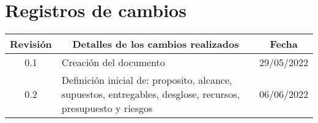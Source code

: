 \section{Registros de cambios}
\label{sec:registro}


\begin{table}[ht]
\label{tab:registro}
\centering
\begin{tabularx}{\linewidth}{@{}|c|X|c|@{}}
\hline
\rowcolor[HTML]{C0C0C0} 
Revisión & \multicolumn{1}{c|}{\cellcolor[HTML]{C0C0C0}Detalles de los cambios realizados} & Fecha      \\ \hline
0.1 & Creación del documento& 29/05/2022\\ \hline
0.2 & Definición inicial de: proposito, alcance, supuestos, entregables, desglose, recursos, presupuesto y riesgos& 06/06/2022\\ \hline
\end{tabularx}
\end{table}

\pagebreak
